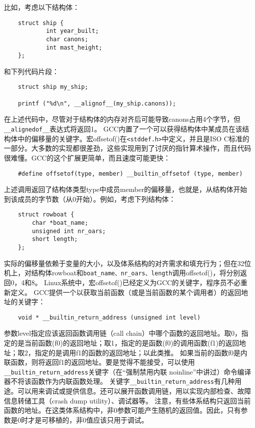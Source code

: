 比如，考虑以下结构体：
\begin{lstlisting}
    struct ship {
            int year_built;
            char canons;
            int mast_height;
    };
\end{lstlisting}
和下列代码片段：
\begin{lstlisting}
    struct ship my_ship;
    
    printf ("%d\n", __alignof__(my_ship.canons));
\end{lstlisting}
在上述代码中，尽管对于结构体的内存对齐后可能导致canons占用4个字节，但\verb+__alignedof__+表达式将返回1。
GCC内置了一个可以获得结构体中某成员在该结构体中的偏移量的关键字。宏offsetof()在\verb+<stddef.h>+中定义，并且是ISO C标准的一部分。大多数的实现都很差劲，这些实现用到了讨厌的指针算术操作，而且代码很难懂。GCC的这个扩展更简单，而且速度可能更快：
\begin{lstlisting}
    #define offsetof(type, member) __builtin_offsetof (type, member)
\end{lstlisting}
上述调用返回了结构体类型type中成员member的偏移量，也就是，从结构体开始到该成员的字节数（从0开始）。例如，考虑下列结构体：
\begin{lstlisting}
    struct rowboat {
        char *boat_name;
        unsigned int nr_oars;
        short length;
    };
\end{lstlisting}
实际的偏移量依赖于变量的大小，以及体系结构的对齐需求和填充行为；但在32位机上，对结构体rowboat和\verb+boat_name、nr_oars、length+调用offsetof()，将分别返回0，4和8。
Linux系统中，宏offsetof()已经定义为GCC的关键字，程序员不必重新定义。
GCC提供一个以获取当前函数（或是当前函数的某个调用者）的返回地址的关键字：
\begin{lstlisting}
    void * __builtin_return_address (unsigned int level)
\end{lstlisting}
参数level指定应该返回函数调用链（call chain）中哪个函数的返回地址。取0，指定的是当前函数(f0)的返回地址；取1，指定的是函数(f0)的调用函数(f1)的返回地址；取2，指定的是调用f1的函数的返回地址；以此类推。
如果当前的函数f0是内联函数，则将返回f1的返回地址。要是觉得不能接受，可以使用\verb+__builtin_return_address+关键字（在“强制禁用内联 {noinline}”中讲过）命令编译器不将该函数作为内联函数处理。
关键字\verb+__builtin_return_address+有几种用途。可以用来调试或提供信息。还可以展开函数调用链，用以实现内部检查、故障信息转储工具（crash dump utility）、调试器等。
注意，有些体系结构只返回当前函数的地址。在这类体系结构中，非0参数可能产生随机的返回值。因此，只有参数是0时才是可移植的，非0值应该只用于调试。

